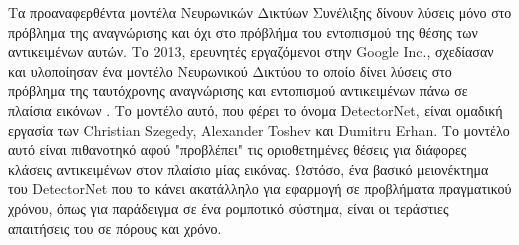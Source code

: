 Τα προαναφερθέντα μοντέλα Νευρωνικών Δικτύων Συνέλιξης δίνουν
λύσεις μόνο στο πρόβλημα της αναγνώρισης και όχι
στο πρόβλήμα του εντοπισμού της θέσης των αντικειμένων αυτών.
Το 2013, ερευνητές εργαζόμενοι στην Google Inc., σχεδίασαν και υλοποίησαν ένα
μοντέλο Νευρωνικού Δικτύου το οποίο δίνει λύσεις στο πρόβλημα της ταυτόχρονης
αναγνώρισης και εντοπισμού αντικειμένων πάνω σε πλαίσια εικόνων \cite{szegedy2013deep}.
Το μοντέλο αυτό, που φέρει το όνομα DetectorNet, είναι ομαδική εργασία των
Christian Szegedy, Alexander Toshev και Dumitru Erhan. Το μοντέλο αυτό είναι
πιθανοτηκό αφού "προβλέπει" τις οριοθετημένες θέσεις για διάφορες κλάσεις
αντικειμένων στον πλαίσιο μίας εικόνας. Ωστόσο, ένα βασικό μειονέκτημα του DetectorNet
που το κάνει ακατάλληλο για εφαρμογή σε προβλήματα πραγματικού χρόνου, όπως
για παράδειγμα σε ένα ρομποτικό σύστημα, είναι οι τεράστιες απαιτήσεις του σε πόρους
και χρόνο.


%
%
